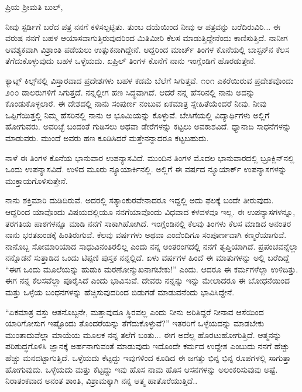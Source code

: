 \noindent
ಪ್ರಿಯ ಶ‍್ರೀಮತಿ ಬುಲ್,

ನೀವು ಸ್ಟರ್ಡಿಗೆ ಬರೆದ ಪತ್ರ ನನಗೆ ಕಳಿಸಲ್ಪಟ್ಟಿತು. ತುಂಬ ದಯೆಯಿಂದ ನೀವು ಆ ಪತ್ರವನ್ನು ಬರೆದಿರುವಿರಿ... ಈ ವರುಷ ನನಗೆ ಬಹಳ ಆಯಾಸವಾಗುತ್ತಿರುವುದರಿಂದ ಮಿತಿಮೀರಿ ಕೆಲಸ ಮಾಡುತ್ತಿದ್ದೇನೆಂದು ಕಾಣಿಸುತ್ತಿದೆ. ನಾನೀಗ ಆವಶ್ಯಕವಾಗಿ ವಿಶ್ರಾಂತಿ ಪಡೆಯಲು ಉತ್ಸುಕನಾಗಿದ್ದೇನೆ. ಆದ್ದರಿಂದ ಮಾರ್ಚ್ ತಿಂಗಳ ಕೊನೆಯಲ್ಲಿ ಬಾಸ್ಟನ್‌ನ ಕೆಲಸ ತೆಗೆದುಕೊಳ್ಳುವುದು ಬಹಳ ಒಳ್ಳೆಯದು. ಏಪ್ರಿಲ್ ತಿಂಗಳ ಕೊನೆಗೆ ನಾನು ಇಂಗ್ಲೆಂಡಿಗೆ ಹೊರಡುತ್ತೇನೆ.

\vspace{0.1cm}

ಕ್ಯಾಟ್ಸ್ ಕಿಲ್ಸ್‌ನಲ್ಲಿ ವಿಸ್ತಾರವಾದ ಪ್ರದೇಶಗಳು ಬಹಳ ಕಡಮೆ ಬೆಲೆಗೆ ಸಿಗುತ್ತವೆ. ೧೦೧ ಎಕರೆಯಿರುವ ಪ್ರದೇಶವೊಂದು ೨೦೦ ಡಾಲರುಗಳಿಗೆ ಸಿಗುತ್ತದೆ. ನನ್ನಲ್ಲೀಗ ಹಣ ಸಿದ್ಧವಾಗಿದೆ. ಆದರೆ ನನ್ನ ಹೆಸರಿನಲ್ಲಿ ನಾನು ಅದನ್ನು ಕೊಂಡುಕೊಳ್ಳಲಾರೆ. ಈ ದೇಶದಲ್ಲಿ ನಾನು ಸಂಪುರ್ಣ ನಂಬುವ ಏಕಮಾತ್ರ ಸ್ನೇಹಿತೆಯೆಂದರೆ ನೀವು. ನೀವು ಒಪ್ಪಿಗೆಯಿತ್ತಲ್ಲಿ ನಿಮ್ಮ ಹೆಸರಿನಲ್ಲಿ ನಾನು ಆ ಭೂಮಿಯನ್ನು ಕೊಳ್ಳುವೆ. ಬೇಸಿಗೆಯಲ್ಲಿ ವಿದ್ಯಾರ್ಥಿಗಳು ಅಲ್ಲಿಗೆ ಹೋಗುವರು. ಅವರಿಚ್ಛೆ ಬಂದಂತೆ ಗುಡಿಸಲು ಅಥವಾ ಡೇರೆಗಳನ್ನು ಕಟ್ಟಲು ಅವಕಾಶವಿದೆ. ಧ್ಯಾನಾದಿ ಸಾಧನೆಗಳನ್ನು ಮಾಡುವರು. ಮುಂದೆ ಅವರು ಹಣ ಕೂಡಿಸಿದರೆ ಮತ್ತೇನನ್ನಾದರೂ ಕಟ್ಟಬಹುದು.

\vspace{0.1cm}

ನಾಳೆ ಈ ತಿಂಗಳ ಕೊನೆಯ ಭಾನುವಾರ ಉಪನ್ಯಾಸವಿದೆ. ಮುಂದಿನ ತಿಂಗಳ ಮೊದಲ ಭಾನುವಾರದಲ್ಲಿ ಬ್ರೂಕ್ಲಿನ್‌ನಲ್ಲಿ ಒಂದು ಉಪನ್ಯಾಸವಿದೆ. ಉಳಿದ ಮೂರು ನ್ಯೂಯಾರ್ಕಿನಲ್ಲಿ. ಅಲ್ಲಿಗೆ ಈ ವರ್ಷದ ನ್ಯೂಯಾರ್ಕ್ ಉಪನ್ಯಾಸಗಳನ್ನು ಮುಕ್ತಾಯಗೊಳಿಸುತ್ತೇನೆ.

\vspace{0.1cm}

ನಾನು ಶಕ್ತಿಮಾರಿ ದುಡಿದಿರುವೆ. ಅದರಲ್ಲಿ ಸತ್ಯಾಂಕುರವೇನಾದರೂ ಇದ್ದಲ್ಲಿ ಅದು ಫಲಕ್ಕೆ ಬಂದೇ ತೀರುವುದು. ಆದ್ದರಿಂದ ಯಾವೊಂದು ವಿಷಯದಲ್ಲಿಯೂ ನನಗೆ\break ಯಾವೊಂದು ವಿಧವಾದ ಕಳವಳವೂ ಇಲ್ಲ. ಈ ಉಪನ್ಯಾಸಗಳನ್ನೂ, ತರಗತಿಯ ಪಾಠಗಳನ್ನೂ ಮಾಡಿ ನನಗೆ ಸಾಕಾಗಿಹೋಗಿದೆ. ಇಂಗ್ಲೆಂಡಿನಲ್ಲಿ ಕೆಲವು ತಿಂಗಳು ಕೆಲಸ ಮಾಡಿದ ಅನಂತರ ನಾನು ಭರತಖಂಡಕ್ಕೆ ಹಿಂತಿರುಗುವೆ. ಕೆಲವು ವರ್ಷಗಳು ಅಥವಾ ಎಂದೆಂದಿಗೂ ಸಂಪೂರ್ಣವಾಗಿ ಕಣ್ಮರೆಯಾಗುವೆ. ನಾನೊಬ್ಬ ಸೋಮಾರಿಯಾದ ಸಾಧುವಿನಂತಿರಲಿಲ್ಲ ಎಂದು ನನ್ನ ಅಂತರಂಗದಲ್ಲಿ ನನಗೆ ತೃಪ್ತಿಯಾಗಿದೆ. ಪ್ರಪಂಚವನ್ನೆಲ್ಲಾ ನನ್ನೊಡನೆ ಸುತ್ತಾಡಿದ ಒಂದು ಟಿಪ್ಪಣಿ ಪುಸ್ತಕ ನನ್ನಲ್ಲಿದೆ. ಏಳು ವರ್ಷಗಳ ಹಿಂದೆ ಈ ಮಾತುಗಳನ್ನು ಅಲ್ಲಿ ಬರೆದಿದ್ದೆ\enginline{-} “ಈಗ ಒಂದು ಮೂಲೆಯನ್ನು ಹುಡುಕಿ ಮರಣೋನ್ಮುಖನಾಗಬೇಕು!'' ಎಂದು. ಆದರೂ ಈ ಕರ್ಮಗಳೆಲ್ಲಾ ಉಳಿದಿತ್ತು. ಈಗ ನನ್ನ ಕೆಲಸವೆಲ್ಲಾ ಪೂರೈಸಿದೆ ಎಂದು ಭಾವಿಸುವೆ. ದೇವರು ನನ್ನನ್ನು ಇನ್ನು ಮೇಲಾದರೂ ಈ ಬೋಧನೆಯಿಂದ ಮತ್ತು ಒಳ್ಳೆಯ ಬಂಧನಗಳನ್ನು ಹೆಚ್ಚಿಸುವುದರಿಂದ ಬಿಡುಗಡೆ ಮಾಡುವನೆಂದು ಭಾವಿಸಿದ್ದೇನೆ.

\vspace{0.1cm}

“ಏಕಮಾತ್ರ ವಸ್ತು ಆತನೊಬ್ಬನೇ, ಮತ್ತಾವುದೂ ಸ್ಥಿರವಲ್ಲ ಎಂದು ನೀನು ಅರಿತಿದ್ದರೆ ನೀನಾವ ಆಸೆಯಿಂದ ಯಾರಿಗೋಸುಗ ಇಷ್ಟೊಂದು ತೊಂದರೆಯನ್ನು ತೆಗೆದುಕೊಳ್ಳುವೆ?” ಇತರರಿಗೆ ಒಳ್ಳೆಯದನ್ನು ಮಾಡಬೇಕು ಮುಂತಾದುವೆಲ್ಲಾ ಮಾಯೆಯ ಮೂಲಕ ನನ್ನ ತಲೆಗೆ ಬಂತು... ಈಗ ಅದೆಲ್ಲ ಹೊರಟುಹೋಗುತ್ತಿದೆ. ಆತ್ಮನನ್ನು ಪರಿಶುದ್ಧಗೊಳಿಸಿ ಜ್ಞಾನಕ್ಕೆ ಅರ್ಹನಾಗುವಂತೆ ಮಾಡುವುದು\enginline{-} ಇದೊಂದೇ ಕರ್ಮದ ಉದ್ದೇಶ ಎಂಬುದು ನನಗೆ ಹೆಚ್ಚು ಹೆಚ್ಚು ಮನದಟ್ಟಾಗುತ್ತಿದೆ. ಒಳ್ಳೆಯದು ಕೆಟ್ಟದ್ದು ಇವುಗಳಿಂದ ಕೂಡಿದ ಈ ಜಗತ್ತು ಭಿನ್ನ ಭಿನ್ನ ರೂಪಗಳಲ್ಲಿ ಸಾಗುತ್ತಾ ಹೋಗುವುದು. ಒಳ್ಳೆಯದು ಮತ್ತು ಕೆಟ್ಟದ್ದು ಇವು ಹೊಸ ನಾಮ ಹೊಸ ಆಸನಗಳನ್ನು ಅಲಂಕರಿಸುವುವು ಅಷ್ಟೆ. ನಿರಾತಂಕವಾದ ಅನಂತ ಶಾಂತಿ, ವಿಶ್ರಾಮಕ್ಕಾಗಿ ನನ್ನ ಆತ್ಮ ಹಾತೊರೆಯುತ್ತಿದೆ..

